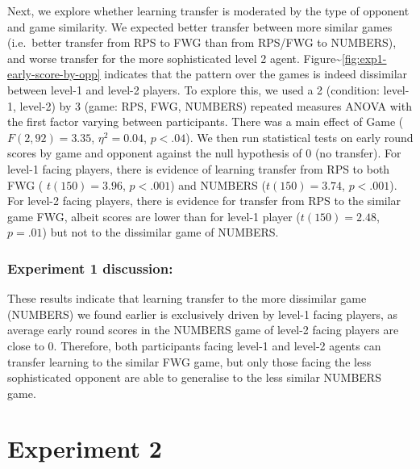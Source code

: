 \documentclass[man,floatsintext]{apa6}
\begin{document}
Next, we explore whether learning transfer is moderated by the type of opponent and game similarity. We expected better transfer between more similar games (i.e.~better transfer from RPS to FWG than from RPS/FWG to NUMBERS), and worse transfer for the more sophisticated level 2 agent. Figure\textasciitilde{}\ref{fig:exp1-early-score-by-opp} indicates that the pattern over the games is indeed dissimilar between level-1 and level-2 players. To explore this, we used a 2 (condition: level-1, level-2) by 3 (game: RPS, FWG, NUMBERS) repeated measures ANOVA with the first factor varying between participants. There was a main effect of Game (\(F(2,92) = 3.35\), \(\eta^{2} = 0.04\), \(p < .04\)). We then run statistical tests on early round scores by game and opponent against the null hypothesis of 0 (no transfer). For level-1 facing players, there is evidence of learning transfer from RPS to both FWG ( \(t(150) = 3.96\), \(p < .001\)) and NUMBERS (\(t(150) = 3.74\), \(p < .001\)). For level-2 facing players, there is evidence for transfer from RPS to the similar game FWG, albeit scores are lower than for level-1 player (\(t(150) = 2.48\), \(p = .01\)) but not to the dissimilar game of NUMBERS.

\hypertarget{experiment-1-discussion}{%
\subsubsection{Experiment 1 discussion:}\label{experiment-1-discussion}}

These results indicate that learning transfer to the more dissimilar game (NUMBERS) we found earlier is exclusively driven by level-1 facing players, as average early round scores in the NUMBERS game of level-2 facing players are close to 0. Therefore, both participants facing level-1 and level-2 agents can transfer learning to the similar FWG game, but only those facing the less sophisticated opponent are able to generalise to the less similar NUMBERS game.

\hypertarget{experiment-2}{%
\section{Experiment 2}\label{experiment-2}}
\end{document}
